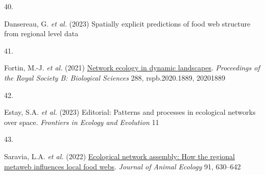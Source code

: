 \documentclass[
]{article}
\newlength{\cslhangindent}
\newlength{\csllabelwidth}
\newenvironment{CSLReferences}[2] %
 {\begin{list}{}{%
  \setlength{\itemindent}{0pt}
  \setlength{\leftmargin}{0pt}
  \setlength{\parsep}{0pt}
  \ifodd #1
   \setlength{\leftmargin}{\cslhangindent}
   \setlength{\itemindent}{-1\cslhangindent}
  \fi
  \setlength{\itemsep}{#2\baselineskip}}}
 {\end{list}}
\newcommand{\CSLLeftMargin}[1]{\parbox[t]{\csllabelwidth}{\strut#1\strut}}
\newcommand{\CSLRightInline}[1]{\parbox[t]{\linewidth - \csllabelwidth}{\strut#1\strut}}
\begin{document}
\begin{CSLReferences}{0}{0}
\CSLLeftMargin{40. }%
\CSLRightInline{Dansereau, G. \emph{et al.} (2023) Spatially explicit
predictions of food web structure from regional level data}

\CSLLeftMargin{41. }%
\CSLRightInline{Fortin, M.-J. \emph{et al.} (2021)
\href{https://doi.org/10.1098/rspb.2020.1889}{Network ecology in dynamic
landscapes}. \emph{Proceedings of the Royal Society B: Biological
Sciences} 288, rspb.2020.1889, 20201889}

\CSLLeftMargin{42. }%
\CSLRightInline{Estay, S.A. \emph{et al.} (2023) Editorial: {Patterns}
and processes in ecological networks over space. \emph{Frontiers in
Ecology and Evolution} 11}

\CSLLeftMargin{43. }%
\CSLRightInline{Saravia, L.A. \emph{et al.} (2022)
\href{https://doi.org/10.1111/1365-2656.13652}{Ecological network
assembly: {How} the regional metaweb influences local food webs}.
\emph{Journal of Animal Ecology} 91, 630--642}

\end{CSLReferences}
\end{document}
